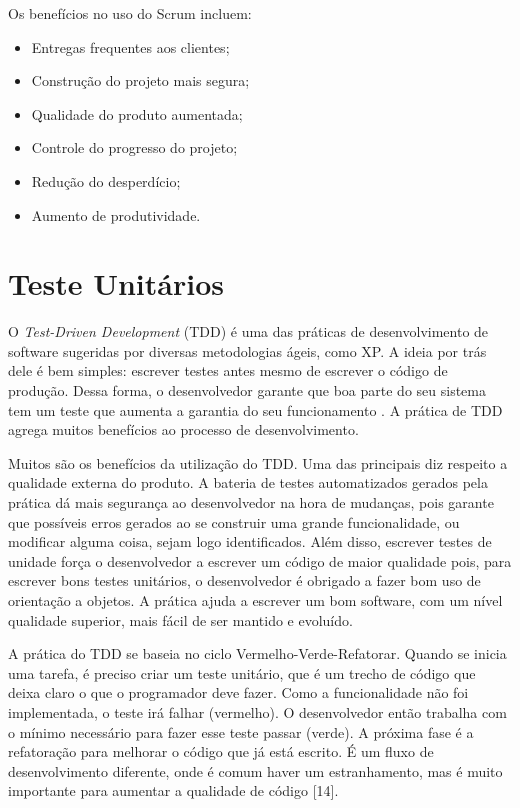 Os benefícios no uso do Scrum incluem:
\begin{itemize}
    \item Entregas frequentes aos clientes;
    \item Construção do projeto mais segura;
    \item Qualidade do produto aumentada;
    \item Controle do progresso do projeto;
    \item Redução do desperdício;
    \item Aumento de produtividade.
\end{itemize}

\section{Teste Unitários}

O \textit{Test-Driven Development} (TDD) é uma das práticas de desenvolvimento de software sugeridas por diversas metodologias ágeis, como XP. A ideia por trás dele é bem simples: escrever testes antes mesmo de escrever o código de produção. Dessa forma, o desenvolvedor garante que boa parte do seu sistema tem um teste que aumenta a garantia do seu funcionamento . A prática de TDD agrega muitos benefícios ao processo de desenvolvimento.

Muitos são os benefícios da utilização do TDD. Uma das principais diz respeito a qualidade externa do produto. A bateria de testes automatizados gerados pela prática dá mais segurança ao desenvolvedor na hora de mudanças, pois garante que possíveis erros gerados ao se construir uma grande funcionalidade, ou modificar alguma coisa, sejam logo identificados. Além disso, escrever testes de unidade força o desenvolvedor a escrever um código de maior qualidade pois, para escrever bons testes unitários, o desenvolvedor é obrigado a fazer bom uso de orientação a objetos. A prática ajuda a escrever um bom software, com um nível qualidade superior, mais fácil de ser mantido e evoluído.

A prática do TDD se baseia no ciclo Vermelho-Verde-Refatorar. Quando se inicia uma tarefa, é preciso criar um teste unitário, que é um trecho de código que deixa claro o que o programador deve fazer. Como a funcionalidade não foi implementada, o teste irá falhar (vermelho). O desenvolvedor então trabalha com o mínimo necessário para fazer esse teste passar (verde). A próxima fase é a refatoração para melhorar o código que já está escrito. É um fluxo de desenvolvimento diferente, onde é comum haver um estranhamento, mas é muito importante para aumentar a qualidade de código [14].
